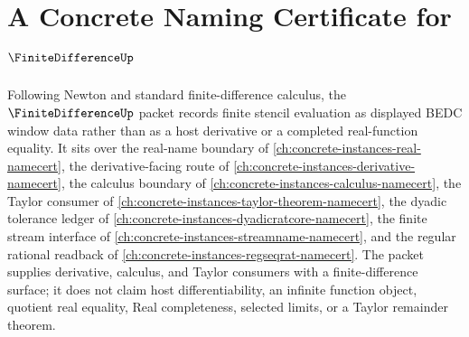 \chapter{A Concrete Naming Certificate for $\FiniteDifferenceUp$}
\label{ch:concrete-instances-finite-difference-namecert}

Following Newton and standard finite-difference calculus, the $\FiniteDifferenceUp$ packet records finite stencil evaluation as displayed BEDC window data rather than as a host derivative or a completed real-function equality. It sits over the real-name boundary of \autoref{ch:concrete-instances-real-namecert}, the derivative-facing route of \autoref{ch:concrete-instances-derivative-namecert}, the calculus boundary of \autoref{ch:concrete-instances-calculus-namecert}, the Taylor consumer of \autoref{ch:concrete-instances-taylor-theorem-namecert}, the dyadic tolerance ledger of \autoref{ch:concrete-instances-dyadicratcore-namecert}, the finite stream interface of \autoref{ch:concrete-instances-streamname-namecert}, and the regular rational readback of \autoref{ch:concrete-instances-regseqrat-namecert}. The packet supplies derivative, calculus, and Taylor consumers with a finite-difference surface; it does not claim host differentiability, an infinite function object, quotient real equality, Real completeness, selected limits, or a Taylor remainder theorem.

